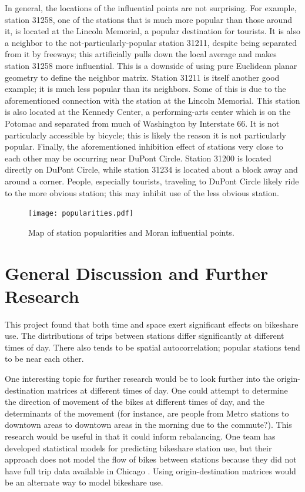 \documentclass[letterpaper,11pt]{article}
\begin{document}
In general, the locations of the influential points are not
surprising. For example, station 31258, one of the stations that is
much more popular than those around it, is located at the Lincoln
Memorial, a popular destination for tourists. It is also a neighbor to
the not-particularly-popular station 31211, despite being separated
from it by freeways; this artificially pulls down the local average and
makes station 31258 more influential. This is a downside of using pure
Euclidean planar geometry to define the neighbor matrix. Station 31211
is itself another good example; it is much less popular than its
neighbors. Some of this is due to the aforementioned connection with
the station at the Lincoln Memorial. This station is also located at
the Kennedy Center, a performing-arts center which is on the Potomac
and separated from much of Washington by Interstate 66. It is not
particularly accessible by bicycle; this is likely the reason it is
not particularly popular. Finally, the aforementioned inhibition
effect of stations very close to each other may be occurring near
DuPont Circle. Station 31200 is located directly on DuPont Circle,
while station 31234 is located about a block away and around a
corner. People, especially tourists, traveling to DuPont Circle likely
ride to the more obvious station; this may inhibit use of the less
obvious station.

\begin{figure}[t]
  \texttt{[image: popularities.pdf]}
  \caption{\label{fig:map} Map of station popularities and Moran
    influential points.}
\end{figure}

\section{General Discussion and Further Research}

This project found that both time and space exert significant effects
on bikeshare use. The distributions of trips between stations differ
significantly at different times of day. There also tends to be
spatial autocorrelation; popular stations tend to be near each other.

One interesting topic for further research would be to look further
into the origin-destination matrices at different times of day. One
could attempt to determine the direction of movement of the bikes at
different times of day, and the determinants of the movement (for
instance, are people from Metro stations to downtown areas to downtown
areas in the morning due to the commute?). This research would be useful
in that it could inform rebalancing. One team has developed
statistical models for predicting bikeshare station use, but their
approach does not model the flow of bikes between stations because
they did not have full trip data available in Chicago
\autocite{Dempsey2013}. Using origin-destination matrices would be an
alternate way to model bikeshare use.
\end{document}
